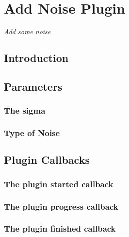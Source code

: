 \chapter{Add Noise Plugin}
\emph{Add some noise}
\section{Introduction}
\section{Parameters}
\subsection{The sigma}
\subsection{Type of Noise}
\section{Plugin Callbacks}
\subsection{The plugin started callback}
\subsection{The plugin progress callback}
\subsection{The plugin finished callback}
